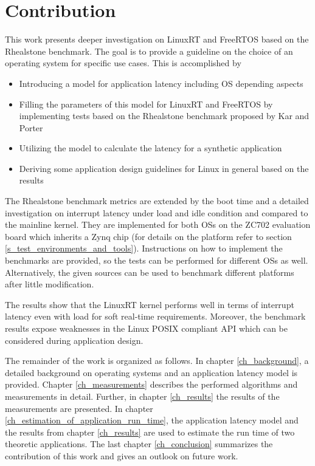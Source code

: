 \section{Contribution}
This work presents deeper investigation on LinuxRT and FreeRTOS based on the Rhealstone benchmark.
The goal is to provide a guideline on the choice of an operating system for specific use cases.
This is accomplished by
	\begin{itemize}
		\item Introducing a model for application latency including \ac{OS} depending aspects
		\item Filling the parameters of this model for LinuxRT and FreeRTOS by implementing tests based on the Rhealstone benchmark proposed by Kar and Porter \cite{kar:itrb} \cite{kar:artbp} 
		\item Utilizing the model to calculate the latency for a synthetic application 
		\item Deriving some application design guidelines for Linux in general based on the results
	\end{itemize} 
The Rhealstone benchmark metrics are extended by the boot time and a detailed investigation on interrupt latency under load and idle condition and compared to the mainline kernel.
They are implemented for both \acp{OS} on the ZC702 evaluation board which inherits a Zynq chip (for details on the platform refer to section \ref{s_test_environments_and_tools}). 
Instructions on how to implement the benchmarks are provided, so the tests can be performed for different \acp{OS} as well.
Alternatively, the given sources can be used to benchmark different platforms after little modification.
\par
The results show that the LinuxRT kernel performs well in terms of interrupt latency even with load for soft real-time requirements.
Moreover, the benchmark results expose weaknesses in the Linux POSIX compliant \ac{API} which can be considered during application design. 
\par
The remainder of the work is organized as follows. In chapter \ref{ch_background}, a detailed background on operating systems and an application latency model is provided. 
Chapter \ref{ch_measurements} describes the performed algorithms and measurements in detail. 
Further, in chapter \ref{ch_results} the results of the measurements are presented. 
In chapter \ref{ch_estimation_of_application_run_time}, the application latency model and the results from chapter \ref{ch_results} are used to estimate the run time of two theoretic applications.  
The last chapter \ref{ch_conclusion} summarizes the contribution of this work and gives an outlook on future work.